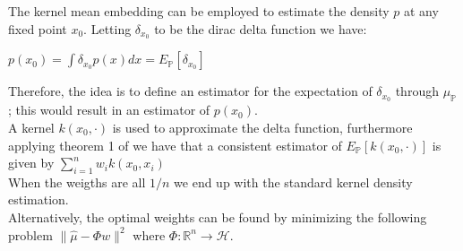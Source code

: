 The kernel mean embedding can be employed to estimate the density $p$ at any fixed point $x_{0}$. Letting $\delta_{x_{0}}$ to be the dirac delta function we have:
\\
\begin{center}
$p(x_{0})=\int \delta_{x_{0}}p(x)dx=E_{\mathbb{P}}[\delta_{x_{0}}]$    
\end{center}

Therefore, the idea is to define an estimator for the expectation of $\delta_{x_{0}}$ through $\mu_{\mathbb{P}}$; this would result in an estimator of $p(x_{0})$.
\\
A kernel $k(x_{0},\cdot)$ is used to approximate the delta function, furthermore applying theorem 1 of \cite{pmlr} we have that a consistent estimator of $E_{\mathbb{P}}[k(x_{0}, \cdot)]$ is given by $\sum\limits_{i=1}^{n}w_{i}k(x_{0},x_{i})$
\\
When the weigths are all $1/n$ we end up with the standard kernel density estimation.
\\
Alternatively,  the optimal weights can be found by minimizing the following problem $ \| \hat{\mu}-\Phi w\|^2$ 
where $\Phi:\mathbb{R}^{n} \rightarrow \mathcal{H}$.
\\